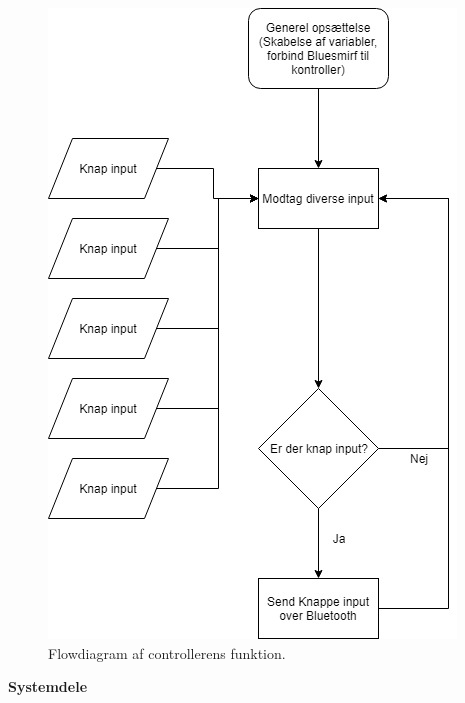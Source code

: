 \begin{figure}[H]
\centering
\includegraphics[scale=0.8]{Billeder/Flowchart2.jpg}
\caption{Flowdiagram af controllerens funktion.}
\label{fig:Flowdiagram2}
\end{figure}

\newpage
\textbf{Systemdele}


